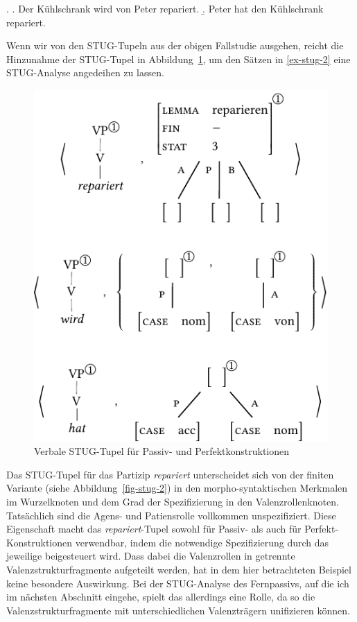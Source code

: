 \ex. \label{ex-stug-2}
\a.  \label{ex-stug-2-a} Der Kühlschrank wird von Peter repariert.
\b. \label{ex-stug-2-b} Peter hat den Kühlschrank repariert.

Wenn wir von den STUG-Tupeln aus der obigen Fallstudie ausgehen, reicht die Hinzunahme der STUG-Tupel in Abbildung~\ref{fig-stug-5}, um den Sätzen in \ref{ex-stug-2} eine STUG-Analyse angedeihen zu lassen.
\begin{figure}[t]
\centering
\includegraphics{graphics/abb95.pdf}
\caption{\label{fig-stug-5}Verbale STUG-Tupel für Passiv- und Perfektkonstruktionen}
\end{figure}
Das STUG-Tupel für das Partizip {\it repariert} unterscheidet sich von der finiten Variante (siehe Abbildung~\ref{fig-stug-2}) in den morpho-syntaktischen Merkmalen im Wurzelknoten und dem Grad der Spezifizierung in den Valenzrollenknoten. Tatsächlich sind die Agens- und Patiensrolle vollkommen unspezifiziert. Diese Eigenschaft macht das {\it repariert}-Tupel sowohl für Passiv- als auch für Perfekt-Konstruktionen verwendbar, indem die notwendige Spezifizierung durch das jeweilige  beigesteuert wird. Dass dabei die Valenzrollen in getrennte Valenzstrukturfragmente aufgeteilt werden, hat in dem hier betrachteten Beispiel keine besondere Auswirkung. Bei der STUG-Analyse des Fernpassivs, auf die ich im nächsten Abschnitt eingehe, spielt das allerdings eine Rolle, da so die Valenzstrukturfragmente mit unterschiedlichen Valenzträgern unifizieren können.  

